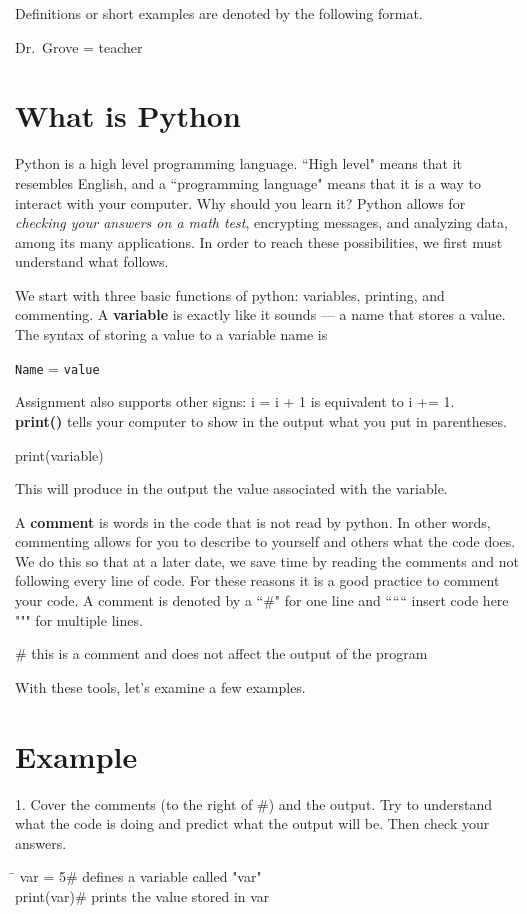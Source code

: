 \documentclass{article}
\newcommand{\define}[1]{\begin{center}\ttfamily #1\end{center}}
\newcommand{\icode}[1]{{\ttfamily #1}}
\begin{document}
\noindent Definitions or short examples are denoted by the following format.
\begin{center}
	\ttfamily Dr.~Grove = teacher
\end{center}
\section{What is Python}
Python is a high level programming language. ``High level" means that it resembles English, and a ``programming language" means that it is a way to interact with your computer. Why should you learn it? Python allows for \textit{checking your answers on a math test}, encrypting messages, and analyzing data, among its many applications. In order to reach these possibilities, we first must understand what follows.

We start with three basic functions of python: variables, printing, and commenting.
A \textbf{variable} is exactly like it sounds --- a name that stores a value. The syntax of storing a value to a variable name is 
\begin{center}
	\texttt{Name} = \texttt{value}
\end{center}
Assignment also supports other signs: \icode{i = i + 1} is equivalent to \icode{i += 1}.\\
\textbf{print()} tells your computer to show in the output what you put in parentheses.
\begin{center}
	\ttfamily print(variable)
\end{center}
This will produce in the output the value associated with the variable.

A \textbf{comment} is words in the code that is not read by python. In other words, commenting allows for you to describe to yourself and others what the code does. We do this so that at a later date, we save time by reading the comments and not following every line of code. For these reasons it is a good practice to comment your code. A comment is denoted by a ``\#" for one line and `````` insert code here """ for multiple lines.
\define{\# this is a comment and does not affect the output of the program}
\noindent With these tools, let's examine a few examples. 

\section{Example}
1. Cover the comments (to the right of \#) and the output. Try to understand what the code is doing and predict what the output will be. Then check your answers.
\vspace{1 mm}
\begin{tcolorbox}
	\ttfamily
	\begin{tabbing}
		\hspace{3.25 in}\=\hspace{3.25 in} \kill
		var = 5\>\# defines a variable called "var"\\
		print(var)\>\# prints the value stored in var
	\end{tabbing}
\end{tcolorbox}
\begin{tcolorbox}[colback=output]
\end{tcolorbox}
\end{document}
